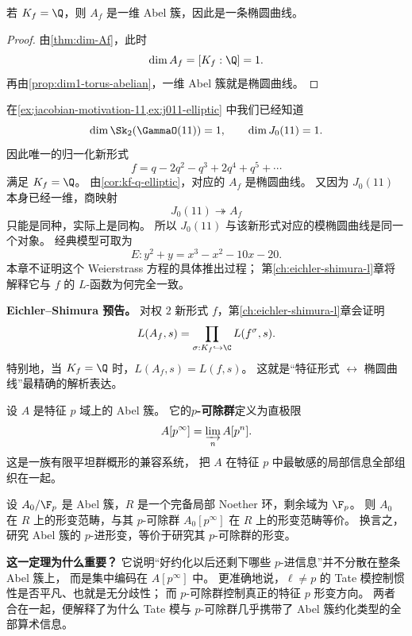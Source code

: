 \begin{corollary}[有理系数情形给出椭圆曲线]
\label{cor:kf-q-elliptic}
若 $K_f=\Q$，则 $A_f$ 是一维 Abel 簇，因此是一条椭圆曲线。
\end{corollary}

\begin{proof}
由\cref{thm:dim-Af}，此时
\[
  \dim A_f=[K_f:\Q]=1.
\]
再由\cref{prop:dim1-torus-abelian}，一维 Abel 簇就是椭圆曲线。
\end{proof}

\begin{example}[级别 $11$ 的模椭圆曲线]
\label{ex:level11-modular-abelian}
在\cref{ex:jacobian-motivation-11,ex:j011-elliptic} 中我们已经知道
\[
  \dim \Sk_2(\GammaO(11))=1,
  \qquad
  \dim J_0(11)=1.
\]
因此唯一的归一化新形式
\[
  f=q-2q^2-q^3+2q^4+q^5+\cdots
\]
满足 $K_f=\Q$。
由\cref{cor:kf-q-elliptic}，对应的 $A_f$ 是椭圆曲线。
又因为 $J_0(11)$ 本身已经一维，商映射
\[
  J_0(11)\twoheadrightarrow A_f
\]
只能是同种，实际上是同构。
所以 $J_0(11)$ 与该新形式对应的模椭圆曲线是同一个对象。
经典模型可取为
\[
  E: y^2+y=x^3-x^2-10x-20.
\]
本章不证明这个 Weierstrass 方程的具体推出过程；
第\ref{ch:eichler-shimura-l}章将解释它与 $f$ 的 $L$-函数为何完全一致。
\end{example}

\textbf{Eichler--Shimura 预告。}
对权 $2$ 新形式 $f$，第\ref{ch:eichler-shimura-l}章会证明
\[
  L(A_f,s)=\prod_{\sigma:K_f\hookrightarrow\C} L(f^\sigma,s).
\]
特别地，当 $K_f=\Q$ 时，$L(A_f,s)=L(f,s)$。
这就是“特征形式 $\leftrightarrow$ 椭圆曲线”最精确的解析表达。

\begin{definition}[$p$-可除群]
\label{def:p-divisible-group}
设 $A$ 是特征 $p$ 域上的 Abel 簇。
它的\textbf{$p$-可除群}定义为直极限
\[
  A[p^\infty]=\varinjlim_n A[p^n].
\]
这是一族有限平坦群概形的兼容系统，
把 $A$ 在特征 $p$ 中最敏感的局部信息全部组织在一起。
\end{definition}

\begin{theorem}
\label{thm:serre-tate}
设 $A_0/\F_p$ 是 Abel 簇，$R$ 是一个完备局部 Noether 环，剩余域为 $\F_p$。
则 $A_0$ 在 $R$ 上的形变范畴，与其 $p$-可除群 $A_0[p^\infty]$ 在 $R$ 上的形变范畴等价。
换言之，研究 Abel 簇的 $p$-进形变，等价于研究其 $p$-可除群的形变。
\end{theorem}

\textbf{这一定理为什么重要？}
它说明“好约化以后还剩下哪些 $p$-进信息”并不分散在整条 Abel 簇上，
而是集中编码在 $A[p^\infty]$ 中。
更准确地说，$\ell\neq p$ 的 Tate 模控制惯性是否平凡、也就是无分歧性；
而 $p$-可除群控制真正的特征 $p$ 形变方向。
两者合在一起，便解释了为什么 Tate 模与 $p$-可除群几乎携带了 Abel 簇约化类型的全部算术信息。

